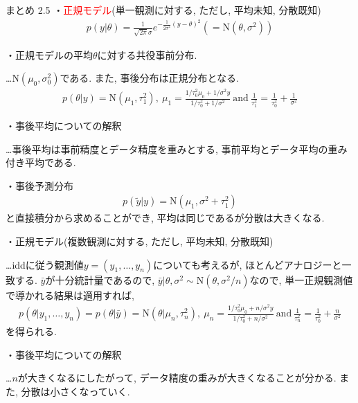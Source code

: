 \documentclass[10pt,dvipdfmx,a4]{beamer}
\newcommand{\eqn}[1]{\begin{align*}#1\end{align*}}
\newcommand{\tcr}[1]{\textcolor{red}{#1}}
\begin{document}
\begin{frame}{まとめ 2.5}
・\tcr{正規モデル}(単一観測に対する, ただし, 平均未知, 分散既知)
\eqn{p(y|\theta)=\frac{1}{\sqrt{2\pi}\sigma}e^{-\frac{1}{2\sigma^2}(y-\theta)^2}(=\text{N}(\theta,\sigma^2))}

・正規モデルの平均$\theta$に対する共役事前分布.

…N$(\mu_0,\sigma_0^2)$である.
また, 事後分布は正規分布となる.
\eqn{p(\theta|y)=\text{N}(\mu_1,\tau^2_1),\ \mu_1=\tfrac{1/\tau_0^2 \mu_0+1/\sigma^2 y}{1/\tau_0^2+1/\sigma^2}\ \text{and}\  \tfrac{1}{\tau_1^2}=\tfrac{1}{\tau_0^2}+\tfrac{1}{\sigma^2}}

・事後平均についての解釈

…事後平均は事前精度とデータ精度を重みとする, 事前平均とデータ平均の重み付き平均である.

・事後予測分布
\eqn{p(\tilde{y}|y)=\text{N}(\mu_1,\sigma^2+\tau^2_1)}
と直接積分から求めることができ, 平均は同じであるが分散は大きくなる.
\end{frame}


\begin{frame}
・正規モデル(複数観測に対する, ただし, 平均未知, 分散既知)

…iddに従う観測値$y=(y_1,\dots,y_n)$についても考えるが, ほとんどアナロジーと一致する.
$\bar{y}$が十分統計量であるので, $\bar{y}|\theta, \sigma^2 \sim \text{N}(\theta,\sigma^2/n)$なので, 単一正規観測値で導かれる結果は適用すれば, 
\eqn{p(\theta|y_1,\dots,y_n)=p(\theta|\bar{y})=\text{N}(\theta|\mu_n,\tau_n^2),\ \mu_n=\tfrac{1/\tau_0^2 \mu_0+n/\sigma^2 y}{1/\tau_0^2+n/\sigma^2}\ \text{and}\  \tfrac{1}{\tau_n^2}=\tfrac{1}{\tau_0^2}+\tfrac{n}{\sigma^2}}
を得られる.

・事後平均についての解釈

…$n$が大きくなるにしたがって, データ精度の重みが大きくなることが分かる.
また, 分散は小さくなっていく.
\end{frame}

\end{document}
